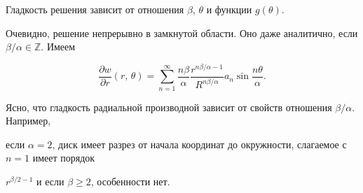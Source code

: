Гладкость решения зависит от отношения $\beta$, $\theta$ и функции $g(\theta)$.

Очевидно, решение непрерывно в замкнутой области. Оно даже аналитично, если \mbox{$\beta/ \alpha\in \mathbb Z$.} Имеем

\[

\frac{\partial w}{\partial r}(r,\,\theta)=\sum\limits_{n=1}^\infty

\frac{n \beta}{\alpha}\frac{r^{n \beta/\alpha

-1}}{R^{n\beta / \alpha}}a_n \sin\frac{n\theta}{\alpha}.

\]

Ясно, что гладкость радиальной производной зависит от свойств отношения $\beta / \alpha$. Например,

если $\alpha=2$, диск имеет разрез от начала координат до окружности, слагаемое с $n=1$ имеет порядок

$r^{\beta/2-1}$ и если $ \beta \geqslant 2 $, особенности нет.





